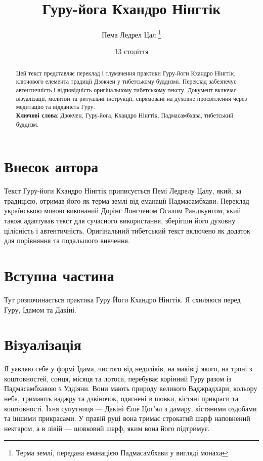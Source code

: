 \documentclass{article}
\begin{document}
\title{Гуру-йога Кхандро Нінгтік}
\author{Пема Ледрел Цал \thanks{ Терма землі, передана еманацією Падмасамбхави у вигляді монаха }}
\date{13 століття}

\maketitle

\begin{abstract}Цей текст представляє переклад і тлумачення практики Гуру-йоги Кхандро Нінгтік,
ключового елемента традиції Дзокчен у тибетському буддизмі. Переклад забезпечує автентичність
і відповідність оригінальному тибетському тексту. Документ включає візуалізації, молитви та
ритуальні інструкції, спрямовані на духовне просвітлення через медитацію та відданість Гуру. \\
\indent \textbf{Ключові слова}: Дзокчен, Гуру-йога, Кхандро Нінгтік, Падмасамбхава, тибетський буддизм.
\end{abstract}

\section*{Внесок автора}
Текст Гуру-йоги Кхандро Нінгтік приписується Пемі Ледрелу Цалу, який, за традицією, отримав його як терма землі від еманації Падмасамбхави. Переклад українською мовою виконаний Дорінг Лонгченом Осалом Ранджунгом, який також адаптував текст для сучасного використання, зберігши його духовну цілісність і автентичність. Оригінальний тибетський текст включено як додаток для порівняння та подальшого вивчення.

\tableofcontents

\vspace{1cm}

\section{Вступна частина}

Тут розпочинається практика Гуру Йоги Кхандро Нінгтік.
Я схиляюся перед Гуру, Ідамом та Дакіні.

\section{Візуалізація}

Я уявляю себе у формі Ідама, чистого від недоліків, на маківці якого,
на троні з коштовностей, сонця, місяця та лотоса, перебуває корінний
Гуру разом із Падмасамбхавою з Уддіяни. Вони мають природу великого
Ваджрадхари, кольору неба, тримають ваджру та дзвіночок, одягнені в
шовки, кістяні прикраси та коштовності. Їхня супутниця — Дакіні Єше
Цог’ял з дамару, кістяними оздобами та іншими прикрасами.
У правій руці вона тримає строкатий шарф наповнений нектаром,
а в лівій — шовковий шарф, яким вона його підтримує.
\end{document}
